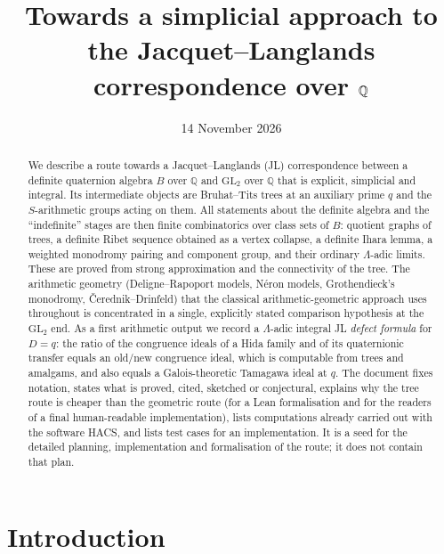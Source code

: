 \documentclass[11pt]{amsart}
\title{Towards a simplicial approach to the Jacquet--Langlands correspondence over $\Q$}
\date{14 November 2026}
\theoremstyle{plain}
\theoremstyle{definition}
\theoremstyle{remark}
\newcommand{\Q}{\mathbb{Q}}\newcommand{\Z}{\mathbb{Z}}\newcommand{\R}{\mathbb{R}}\newcommand{\C}{\mathbb{C}}
\newcommand{\GL}{\mathrm{GL}}\newcommand{\SL}{\mathrm{SL}}\newcommand{\PGL}{\mathrm{PGL}}
\begin{document}
\begin{abstract}
We describe a route towards a Jacquet--Langlands (JL) correspondence between a definite quaternion algebra $B$ over $\Q$ and $\GL_2$ over $\Q$ that is explicit, simplicial and integral.
Its intermediate objects are Bruhat--Tits trees at an auxiliary prime $q$ and the $S$-arithmetic groups acting on them.
All statements about the definite algebra and the ``indefinite'' stages are then finite combinatorics over class sets of $B$: quotient graphs of trees, a definite Ribet sequence obtained as a vertex collapse, a definite Ihara lemma, a weighted monodromy pairing and component group, and their ordinary $\Lambda$-adic limits.
These are proved from strong approximation and the connectivity of the tree.
The arithmetic geometry (Deligne--Rapoport models, Néron models, Grothendieck's monodromy, Čerednik--Drinfeld) that the classical arithmetic-geometric approach uses throughout is concentrated in a single, explicitly stated comparison hypothesis at the $\GL_2$ end.
As a first arithmetic output we record a $\Lambda$-adic integral JL \emph{defect formula} for $D=q$: the ratio of the congruence ideals of a Hida family and of its quaternionic transfer equals an old/new congruence ideal, which is computable from trees and amalgams, and also equals a Galois-theoretic Tamagawa ideal at $q$.
The document fixes notation, states what is proved, cited, sketched or conjectural, explains why the tree route is cheaper than the geometric route (for a Lean formalisation and for the readers of a final human-readable implementation), lists computations already carried out with the software HACS, and lists test cases for an implementation.
It is a seed for the detailed planning, implementation and formalisation of the route; it does not contain that plan.
\end{abstract}

\maketitle
\setcounter{tocdepth}{1}
\tableofcontents

\section{Introduction}\label{sec:intro}
\end{document}
